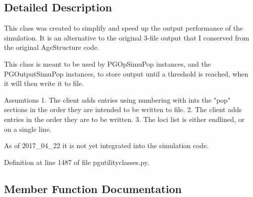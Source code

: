 \subsection{Detailed Description}
\begin{DoxyVerb}This class was created to simplify
and speed up the output performance 
of the simulation.  It is an alternative
to the original 3-file output that I conserved
from the original AgeStructure code.  

This class is meant to be used by PGOpSimuPop instances,
and the PGOutputSimuPop instances,
to store output until a threshold is reached, when it
will then write it to file.  

Assumtions 
  1. The client adds entries using numbering with ints the "pop" sections
    in the order they are intended to be written to file. 
  2.  The client adds entries in the order they are to be written.
  3.  The loci list is either \n endlined, or on a single line.

As of 2017_04_22 it is not yet integrated into the
simulation code.
\end{DoxyVerb}
 

Definition at line 1487 of file pgutilityclasses.\+py.



\subsection{Member Function Documentation}
